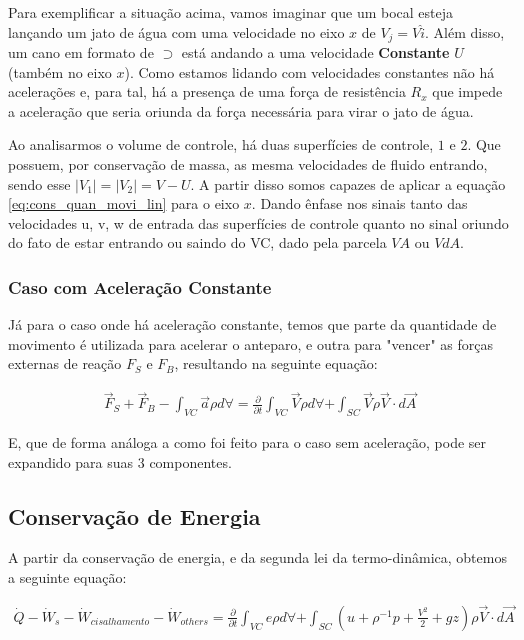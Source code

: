 \documentclass{article}
\begin{document}
Para exemplificar a situação acima, vamos imaginar que um bocal esteja lançando um jato de água com uma velocidade no eixo $x$ de $V_j = V \hat i$. Além disso, um cano em formato de $\supset$ está andando a uma velocidade \textbf{Constante} $U$ (também no eixo $x$). Como estamos lidando
com velocidades constantes não há acelerações e, para tal, há a presença de uma força de resistência $R_x$ que impede a aceleração que seria oriunda da força necessária para virar o jato de água.

Ao analisarmos o volume de controle, há duas superfícies de controle, $1$ e $2$. Que possuem, por conservação de massa, as mesma velocidades de fluido entrando, sendo esse $|V_1| = |V_2| = V - U$. A partir disso somos capazes de aplicar a equação  \ref{eq:cons_quan_movi_lin} para o eixo $x$. Dando ênfase nos sinais tanto das velocidades {u, v, w} de entrada das superfícies de controle quanto no sinal oriundo do fato de estar entrando ou saindo do VC, dado pela parcela $VA$ ou $VdA$.

\subsubsection{Caso com Aceleração Constante}
Já para o caso onde há aceleração constante, temos que parte da quantidade de movimento é utilizada para acelerar o anteparo, e outra para "vencer" as forças externas de reação $F_{S}$ e $F_{B}$, resultando na seguinte equação:

\begin{align}
    \vec{F}_{S} + \vec{F}_B - \int_{VC} \vec{a} \rho d\forall = \frac{\partial}{\partial t}\int_{VC}\vec V \rho d\forall + \int_{SC} \vec V \rho \vec V\cdot d \vec A
\end{align}

E, que de forma análoga a como foi feito para o caso sem aceleração, pode ser expandido para suas $3$ componentes.

\newpage
\subsection{Conservação de Energia}
A partir da conservação de energia, e da segunda lei da termo-dinâmica, obtemos a seguinte equação:

\begin{align}
    \dot Q - \dot W_s - \dot{W}_{cisalhamento} - \dot{W}_{others} = \frac{\partial}{\partial t}\int_{VC} e \rho d\forall + \int_{SC} \left(u + \rho^{-1} p + \frac{V^2}{2} + gz\right) \rho \vec V \cdot d\vec A
\end{align}
\end{document}
